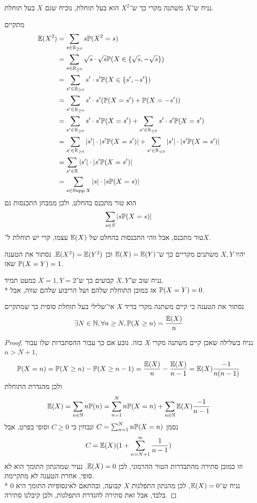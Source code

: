 \subquestion{}
נניח ש־$X$ משתנה מקרי כך ש־$X^2$ הוא בעל תוחלת, נוכיח שגם $X$ בעל תוחלת.
\begin{solution}
	מתקיים
	\begin{align*}
		\mathbb{E}(X^2)
		& = \sum_{s \in \mathbb{R}_{\ge 0}} s \mathbb{P}(X^2 = s) \\
		& = \sum_{s \in \mathbb{R}_{\ge 0}} \sqrt{s} \cdot \sqrt{s} \mathbb{P}(X \in \{\sqrt{s}, -\sqrt{s}\}) \\
		& = \sum_{s' \in \mathbb{R}_{\ge 0}} s' \cdot s' \mathbb{P}(X \in \{s', -s'\}) \\
		& = \sum_{s' \in \mathbb{R}_{\ge 0}} s' \cdot s' (\mathbb{P}(X = s') + \mathbb{P}(X = -s')) \\
		& = \sum_{s' \in \mathbb{R}_{\ge 0}} s' \cdot s' \mathbb{P}(X = s') + \sum_{s' \in \mathbb{R}_{\ge 0}} s' \cdot s' \mathbb{P}(X = s') \\
		& = \sum_{s' \in \mathbb{R}_{\ge 0}} |s'| \cdot |s' \mathbb{P}(X = s')| + \sum_{s' \in \mathbb{R}_{< 0}} |s'| \cdot |s' \mathbb{P}(X = s')| \\
		& = \sum_{s' \in \mathbb{R}} |s'| \cdot |s' \mathbb{P}(X = s')| \\
		& = \sum_{s \in \operatorname{Supp} X} |s| \cdot |s \mathbb{P}(X = s)|
	\end{align*}
	הוא טור מתכנס בהחלט, ולכן ממבחן התכנסות גם
	\[
		\sum_{s \in S} |s \mathbb{P}(X = s)|
	\]
	טור מתכנס, אבל זוהי התכנסות בהחלט של $\mathbb{E}(X)$ עצמו, קרי יש תוחלת ל־$X$.
\end{solution}

\subquestion{}
יהיו $X, Y$ משתנים מקריים כך ש־$\mathbb{E}(X) = \mathbb{E}(Y)$ וכן $\mathbb{E}(X^2) = \mathbb{E}(Y^2)$.
נסתור את הטענה שאז $\mathbb{P}(X = Y) = 1$.
\begin{solution}
	נניח שוב ש־$X, Y$ קבועים כך ש־$X = 1, Y = 2$ כמעט תמיד. \\*
	אז כמובן התוחלת שלהם ושל הריבוע שלהם שווה, אבל $\mathbb{P}(X = Y) = 0$.
\end{solution}

\subquestion{}
נסתור את הטענה כי קיים משתנה מקרי בדיד $X$ אי־שלילי בעל תוחלת סופית כך שמתקיים
\[
	\exists N \in \mathbb{N}, \forall n \ge N, \mathbb{P}(X \ge n) = \frac{\mathbb{E}(X)}{n}
\]
\begin{proof}
	נניח בשלילה שאכן קיים משתנה מקרי $X$ כזה.
	נובע אם כך עבור ההסתברות שלו עבור $n > N + 1$,
	\[
		\mathbb{P}(X = n)
		= \mathbb{P}(X \ge n) - \mathbb{P}(X \ge n - 1)
		= \frac{\mathbb{E}(X)}{n} - \frac{\mathbb{E}(X)}{n - 1}
		= \mathbb{E}(X) \frac{-1}{n(n - 1)}
	\]
	ולכן מהגדרת התוחלת
	\[
		\mathbb{E}(X)
		= \sum_{n \in \mathbb{N}} n \mathbb{P}(n)
		= \sum_{n = 1}^{N} n \mathbb{P}(X = n) + \sum_{n \in \mathbb{N}} \mathbb{E}(X) \frac{-1}{n - 1}
	\]
	נסמן $C = \sum_{n = 1}^{N} n \mathbb{P}(X = n)$ ונבחין כי $C \ge 0$ וסופי בפרט, אבל
	\[
		C = \mathbb{E}(X) (1 + \sum_{n = N + 1}^{\infty} \frac{1}{n - 1})
	\]
	וזו כמובן סתירה מהתבדרות הטור ההרמוני, לכן $\mathbb{E}(X) = 0$. נעיר שמהנתון התומך הוא לא סופי, אחרת הטענה לא מתקיימת. \\*
	נניח ש־$\mathbb{E}(X) = 0$, לכן מהנתון התפלגות $X$ קבועה, ובהתאם לאינסופיות התומך היא 0 בלבד, אבל זאת סתירה להגדרת התפלגות, ולכן קיבלנו סתירה.
\end{proof}

